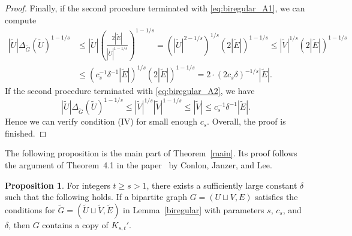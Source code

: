 \documentclass[11pt]{article}
\theoremstyle{definition}
\newtheorem{proposition}[theorem]{Proposition}
\begin{document}
\begin{proof}
    Finally, if the second procedure terminated with \eqref{eq:biregular_A1}, we can compute \begin{align*}
        |\tilde{U}|\Delta_{\tilde{G}}(\tilde{U})^{1 - 1/s} &\leq |\tilde{U}|\left( \frac{2|\tilde{E}|}{|\tilde{U}|^{1-1/s}} \right)^{1 - 1/s} = \left( |\tilde{U}|^{2-1/s} \right)^{1/s}\left( 2|\tilde{E}| \right)^{1 - 1/s} \leq |\tilde{V}|^{1/s}\left( 2|\tilde{E}| \right)^{1 - 1/s}\\
        &\leq \left( c_s^{-1}\delta^{-1}|\tilde{E}| \right)^{1/s}\left( 2|\tilde{E}| \right)^{1 - 1/s} = 2 \cdot \left( 2c_s\delta \right)^{-1/s}|\tilde{E}|.
    \end{align*} If the second procedure terminated with \eqref{eq:biregular_A2}, we have \begin{equation*}
         |\tilde{U}|\Delta_{\tilde{G}}(\tilde{U})^{1 - 1/s} \leq |\tilde{V}|^{1/s}|\tilde{V}|^{1-1/s} \leq |\tilde{V}| \leq c_s^{-1}\delta^{-1}|\tilde{E}|.
    \end{equation*} Hence we can verify condition (IV) for small enough $c_s$. Overall, the proof is finished.
\end{proof}

The following proposition is the main part of Theorem~\ref{main}. Its proof follows the argument of Theorem~4.1 in the paper~\cite{conlon2021more} by Conlon, Janzer, and Lee.
\begin{proposition}\label{cjl_Kst}
    For integers $t \geq s > 1$, there exists a sufficiently large constant $\delta$ such that the following holds. If a bipartite graph $G = (U \sqcup V, E)$ satisfies the conditions for $\tilde{G} = (\tilde{U} \sqcup \tilde{V}, \tilde{E})$ in Lemma~\ref{biregular} with parameters $s$, $c_s$, and $\delta$, then $G$ contains a copy of $K_{s,t}'$.
\end{proposition}
\end{document}

